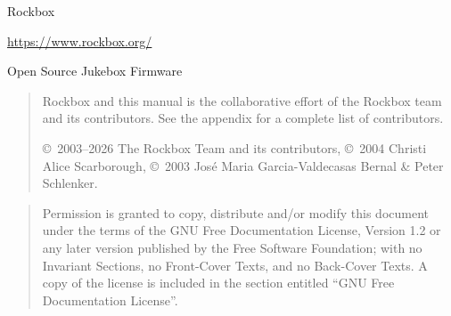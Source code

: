 %
%
%
%
%
\Ifpdfoutput{
\newcommand{\latexbuild}{pdf\LaTeX}}
{\newcommand{\latexbuild}{\TeX4ht}}

%
{\begin{center}{\Large{Rockbox}}\end{center}}

\vspace{1cm}
\noindent
\begin{center}
\url{https://www.rockbox.org/}

\noindent
Open Source Jukebox Firmware
\end{center}

\vspace{6cm}
\begin{quote}
Rockbox and this manual is the collaborative effort of the
Rockbox team and its contributors. See the appendix for a complete list of
contributors.

\copyright~2003--2026 The Rockbox Team and its contributors,
\copyright~2004 Christi Alice Scarborough,
\copyright~2003 Jos\'{e} Maria Garcia-Valdecasas Bernal \& Peter Schlenker.
\end{quote}
\vspace{3mm}
\begin{center}
\end{center}

\vspace{\fill}
\begin{quote}
  Permission is granted to copy, distribute and/or modify this document
  under the terms of the GNU Free Documentation License, Version 1.2
  or any later version published by the Free Software Foundation;
  with no Invariant Sections, no Front-Cover Texts, and no Back-Cover Texts.
  A copy of the license is included in the section entitled ``GNU
  Free Documentation License''.
\end{quote}


